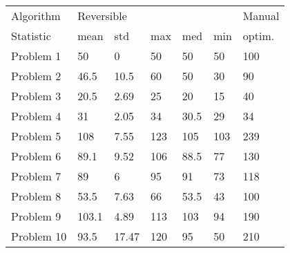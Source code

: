 \begin{tabular}{lllllll}
\toprule
Algorithm & \multicolumn{5}{l}{Reversible} & Manual \\
Statistic &       mean &    std &  max &   med &  min & optim. \\
\midrule
Problem 1  &         50 &      0 &   50 &    50 &   50 &    100 \\
Problem 2  &       46.5 &   10.5 &   60 &    50 &   30 &     90 \\
Problem 3  &       20.5 &   2.69 &   25 &    20 &   15 &     40 \\
Problem 4  &         31 &   2.05 &   34 &  30.5 &   29 &     34 \\
Problem 5  &        108 &   7.55 &  123 &   105 &  103 &    239 \\
Problem 6  &       89.1 &   9.52 &  106 &  88.5 &   77 &    130 \\
Problem 7  &         89 &      6 &   95 &    91 &   73 &    118 \\
Problem 8  &       53.5 &   7.63 &   66 &  53.5 &   43 &    100 \\
Problem 9  &      103.1 &   4.89 &  113 &   103 &   94 &    190 \\
Problem 10 &       93.5 &  17.47 &  120 &    95 &   50 &    210 \\
\bottomrule
\end{tabular}
